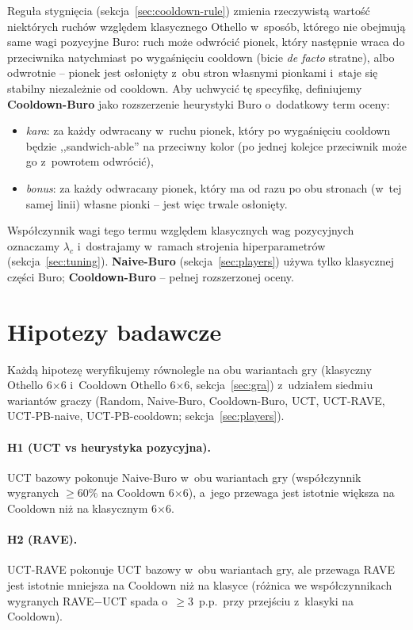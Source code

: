 \documentclass[11pt,a4paper]{article}
\begin{document}
Reguła stygnięcia (sekcja~\ref{sec:cooldown-rule}) zmienia rzeczywistą wartość niektórych ruchów względem klasycznego Othello w~sposób, którego nie obejmują same wagi pozycyjne Buro: ruch może odwrócić pionek, który następnie wraca do przeciwnika natychmiast po wygaśnięciu cooldown (bicie \emph{de facto} stratne), albo odwrotnie -- pionek jest osłonięty z~obu stron własnymi pionkami i~staje się stabilny niezależnie od cooldown. Aby uchwycić tę specyfikę, definiujemy \textbf{Cooldown-Buro} jako rozszerzenie heurystyki Buro o~dodatkowy term oceny:
\begin{itemize}[leftmargin=1.5em,itemsep=2pt]
    \item \emph{kara}: za każdy odwracany w~ruchu pionek, który po wygaśnięciu cooldown będzie ,,sandwich-able'' na przeciwny kolor (po jednej kolejce przeciwnik może go z~powrotem odwrócić),
    \item \emph{bonus}: za każdy odwracany pionek, który ma od razu po obu stronach (w~tej samej linii) własne pionki -- jest więc trwale osłonięty.
\end{itemize}
Współczynnik wagi tego termu względem klasycznych wag pozycyjnych oznaczamy $\lambda_c$ i~dostrajamy w~ramach strojenia hiperparametrów (sekcja~\ref{sec:tuning}). \textbf{Naive-Buro} (sekcja~\ref{sec:players}) używa tylko klasycznej części Buro; \textbf{Cooldown-Buro} -- pełnej rozszerzonej oceny.

\section{Hipotezy badawcze}

Każdą hipotezę weryfikujemy równolegle na obu wariantach gry (klasyczny Othello 6$\times$6 i~Cooldown Othello 6$\times$6, sekcja~\ref{sec:gra}) z~udziałem siedmiu wariantów graczy (Random, Naive-Buro, Cooldown-Buro, UCT, UCT-RAVE, UCT-PB-naive, UCT-PB-cooldown; sekcja~\ref{sec:players}).

\paragraph{H1 (UCT vs heurystyka pozycyjna).}
UCT bazowy pokonuje Naive-Buro w~obu wariantach gry (współczynnik wygranych $\geq 60\%$ na Cooldown 6$\times$6), a~jego przewaga jest istotnie większa na Cooldown niż na klasycznym 6$\times$6.

\paragraph{H2 (RAVE).}
UCT-RAVE pokonuje UCT bazowy w~obu wariantach gry, ale przewaga RAVE jest istotnie mniejsza na Cooldown niż na klasyce (różnica we współczynnikach wygranych RAVE$-$UCT spada o~$\geq 3$~p.p.\ przy przejściu z~klasyki na Cooldown).
\end{document}
